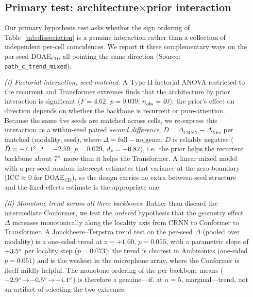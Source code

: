 \subsection{\texorpdfstring{Primary test: architecture$\times$prior interaction}{Primary test: architecture-prior interaction}}
\label{sec:anova}
Our primary hypothesis test asks whether the sign ordering of
Table~\ref{tab:dissociation} is a genuine interaction rather than a collection of
independent per-cell coincidences. We report it three complementary ways on the
per-seed DOAE$_\mathrm{CD}$, all pointing the same direction
(Source: \texttt{path\_c\_trend\_mixed}).

\emph{(i) Factorial interaction, seed-matched.} A Type-II factorial ANOVA
restricted to the recurrent and Transformer extremes finds that the
architecture by prior interaction is significant ($F=4.62$, $p=0.039$;
$n_{\text{obs}}=40$):
the prior's effect on direction depends on whether the backbone is recurrent or
pure-attention. Because the same five seeds are matched across cells, we re-express
this interaction as a within-seed paired \emph{second difference},
$D=\Delta_{\text{CRNN}}-\Delta_{\text{Xfm}}$ per matched (modality, seed), where
$\Delta=\text{full}-\text{no\_geom}$; $D$ is reliably negative
($\bar D=-7.1^\circ$, $t=-2.59$, $p=0.029$, $d_z=-0.82$), i.e.\ the prior helps the
recurrent backbone about $7^\circ$ more than it helps the Transformer. A linear
mixed model with a per-seed random intercept estimates that variance at the zero
boundary (ICC$\approx0$ for DOAE$_\mathrm{CD}$), so the design carries no extra
between-seed structure and the fixed-effects estimate is the appropriate one.

\emph{(ii) Monotone trend across all three backbones.} Rather than discard the
intermediate Conformer, we test the \emph{ordered} hypothesis that the geometry
effect $\Delta$ increases monotonically along the locality axis from CRNN to
Conformer to Transformer. A Jonckheere--Terpstra trend test on the per-seed
$\Delta$ (pooled over modality) is a one-sided trend at $z=+1.60$, $p=0.055$, with a
parametric slope of $+3.5^\circ$ per locality step ($p=0.073$); the trend is
clearest in Ambisonics (one-sided $p=0.051$) and is the weakest in the microphone
array, where the Conformer is itself mildly helpful. The monotone ordering of the
per-backbone means ($-2.9^\circ\!\to\!-0.5^\circ\!\to\!+4.1^\circ$) is therefore
a genuine---if, at $n=5$, marginal---trend, not an artifact of selecting the two
extremes.

